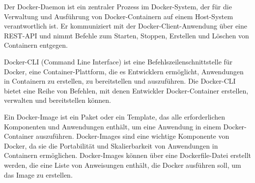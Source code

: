 Der Docker-Daemon ist ein zentraler Prozess im Docker-System, der für die Verwaltung und Ausführung von Docker-Containern auf einem Host-System verantwortlich ist. Er kommuniziert mit der Docker-Client-Anwendung über eine REST-API und nimmt Befehle zum Starten, Stoppen, Erstellen und Löschen von Containern entgegen.

Docker-CLI (Command Line Interface) ist eine Befehlszeilenschnittstelle für Docker, eine Container-Plattform, die es Entwicklern ermöglicht, Anwendungen in Containern zu erstellen, zu bereitstellen und auszuführen. Die Docker-CLI bietet eine Reihe von Befehlen, mit denen Entwickler Docker-Container erstellen, verwalten und bereitstellen können.

Ein Docker-Image ist ein Paket oder ein Template, das alle erforderlichen Komponenten und Anwendungen enthält, um eine Anwendung in einem Docker-Container auszuführen. Docker-Images sind eine wichtige Komponente von Docker, da sie die Portabilität und Skalierbarkeit von Anwendungen in Containern ermöglichen. Docker-Images können über eine Dockerfile-Datei erstellt werden, die eine Liste von Anweisungen enthält, die Docker ausführen soll, um das Image zu erstellen.

